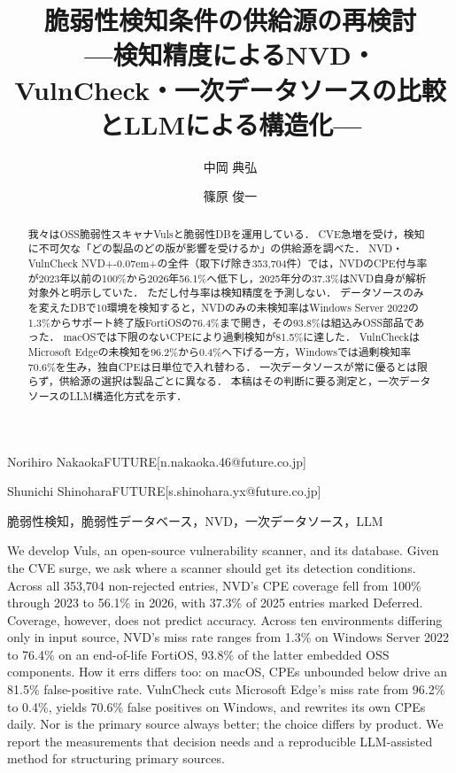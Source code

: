 \documentclass{css}
\newcommand{\nvdpp}{NVD+\kern-0.07em+}
\begin{document}

\title{脆弱性検知条件の供給源の再検討 \\ ---検知精度によるNVD・VulnCheck・一次データソースの比較とLLMによる構造化---}



\author{中岡 典弘}{Norihiro Nakaoka}{FUTURE}[n.nakaoka.46@future.co.jp]
\author{篠原 俊一}{Shunichi Shinohara}{FUTURE}[s.shinohara.yx@future.co.jp]

\begin{abstract}
我々はOSS脆弱性スキャナVulsと脆弱性DBを運用している．
CVE急増を受け，検知に不可欠な「どの製品のどの版が影響を受けるか」の供給源を調べた．
NVD・VulnCheck \nvdpp の全件（取下げ除き353,704件）では，NVDのCPE付与率が2023年以前の100\%から2026年56.1\%へ低下し，2025年分の37.3\%はNVD自身が解析対象外と明示していた．
ただし付与率は検知精度を予測しない．
データソースのみを変えたDBで10環境を検知すると，NVDのみの未検知率はWindows Server 2022の1.3\%からサポート終了版FortiOSの76.4\%まで開き，その93.8\%は組込みOSS部品であった．
macOSでは下限のないCPEにより過剰検知が81.5\%に達した．
VulnCheckはMicrosoft Edgeの未検知を96.2\%から0.4\%へ下げる一方，Windowsでは過剰検知率70.6\%を生み，独自CPEは日単位で入れ替わる．
一次データソースが常に優るとは限らず，供給源の選択は製品ごとに異なる．
本稿はその判断に要る測定と，一次データソースのLLM構造化方式を示す．
\end{abstract}


\begin{jkeyword}
脆弱性検知，脆弱性データベース，NVD，一次データソース，LLM
\end{jkeyword}

\begin{eabstract}
We develop Vuls, an open-source vulnerability scanner, and its database.
Given the CVE surge, we ask where a scanner should get its detection conditions.
Across all 353,704 non-rejected entries, NVD's CPE coverage fell from 100\% through 2023 to 56.1\% in 2026, with 37.3\% of 2025 entries marked Deferred.
Coverage, however, does not predict accuracy.
Across ten environments differing only in input source, NVD's miss rate ranges from 1.3\% on Windows Server 2022 to 76.4\% on an end-of-life FortiOS, 93.8\% of the latter embedded OSS components.
How it errs differs too: on macOS, CPEs unbounded below drive an 81.5\% false-positive rate.
VulnCheck cuts Microsoft Edge's miss rate from 96.2\% to 0.4\%, yields 70.6\% false positives on Windows, and rewrites its own CPEs daily.
Nor is the primary source always better; the choice differs by product.
We report the measurements that decision needs and a reproducible LLM-assisted method for structuring primary sources.
\end{eabstract}
\end{document}
